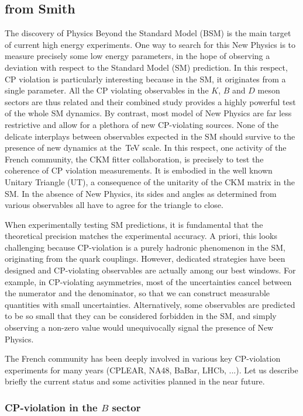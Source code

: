 \subsection{from Smith}

The discovery of Physics Beyond the Standard Model (BSM) is the main target of
current high energy experiments. One way to search for this New Physics is to
measure precisely some low energy parameters, in the hope of observing a
deviation with respect to the Standard Model (SM) prediction. In this respect,
CP violation is particularly interesting because in the SM, it originates from
a single parameter. All the CP violating observables in the $K$, $B$ and $D$
meson sectors are thus related and their combined study provides a highly
powerful test of the whole SM dynamics. By contrast, most model of New Physics
are far less restrictive and allow for a plethora of new CP-violating sources.
None of the delicate interplays between observables expected in the SM should
survive to the presence of new dynamics at the~TeV scale. In this respect, one
activity of the French community, the CKM fitter collaboration, is precisely
to test the coherence of CP violation measurements. It is embodied in the well
known Unitary Triangle (UT), a consequence of the unitarity of the CKM matrix
in the SM. In the absence of New Physics, its sides and angles as determined
from various observables all have to agree for the triangle to close.

When experimentally testing SM predictions, it is fundamental that the
theoretical precision matches the experimental accuracy. A priori, this looks
challenging because CP-violation is a purely hadronic phenomenon in the SM,
originating from the quark couplings. However, dedicated strategies have been
designed and CP-violating observables are actually among our best windows. For
example, in CP-violating asymmetries, most of the uncertainties cancel between
the numerator and the denominator, so that we can construct measurable
quantities with small uncertainties. Alternatively, some observables are
predicted to be so small that they can be considered forbidden in the SM, and
simply observing a non-zero value would unequivocally signal the presence of
New Physics.

The French community has been deeply involved in various key CP-violation
experiments for many years (CPLEAR, NA48, BaBar, LHCb, ...). Let us describe
briefly the current status and some activities planned in the near future.

\subsubsection*{CP-violation in the $B$ sector}

